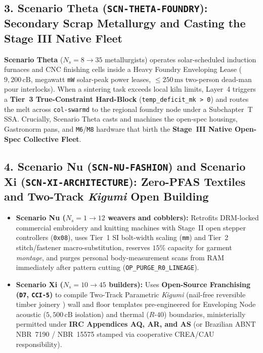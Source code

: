 \subsection{3. Scenario Theta (\texttt{SCN-THETA-FOUNDRY}): Secondary Scrap Metallurgy and Casting the Stage III Native Fleet}
\textbf{Scenario Theta} ($N_s = 8 \to 35$ metallurgists) operates solar-scheduled induction furnaces and CNC finishing cells inside a Heavy Foundry Enveloping Lease ($9{,}200\,\mathrm{cB}$, megawatt \texttt{mW} solar-peak power leases, $\le 250\,\mathrm{ms}$ two-person dead-man pour interlocks). When a sintering task exceeds local kiln limits, Layer~4 triggers a \textbf{Tier~3 True-Constraint Hard-Block} (\texttt{temp\_deficit\_mk > 0}) and routes the melt across \texttt{col-swarmd} to the regional foundry node under a Subchapter~T SSA. Crucially, Scenario Theta casts and machines the open-spec housings, Gastronorm pans, and \texttt{M6}/\texttt{M8} hardware that birth the \textbf{Stage~III Native Open-Spec Collective Fleet}.

\subsection{4. Scenario Nu (\texttt{SCN-NU-FASHION}) and Scenario Xi (\texttt{SCN-XI-ARCHITECTURE}): Zero-PFAS Textiles and Two-Track \textit{Kigumi} Open Building}
\begin{itemize}
    \item \textbf{Scenario Nu ($N_s = 1 \to 12$ weavers and cobblers):} Retrofits DRM-locked commercial embroidery and knitting machines with Stage~II open stepper controllers (\texttt{0x08}), uses Tier~1 SI bolt-width scaling (\texttt{mm}) and Tier~2 stitch/fastener macro-substitution, reserves $15\%$ capacity for garment \textit{montage}, and purges personal body-measurement scans from RAM immediately after pattern cutting (\texttt{OP\_PURGE\_R0\_LINEAGE}).
    \item \textbf{Scenario Xi ($N_s = 10 \to 45$ builders):} Uses \textbf{Open-Source Franchising (\texttt{D7}, \texttt{CCI-5})} to compile Two-Track Parametric \textit{Kigumi} (nail-free reversible timber joinery \parencite{habraken1972supports,brand1994buildings}) wall and floor templates pre-engineered for Enveloping Node acoustic ($5{,}500\,\mathrm{cB}$ isolation) and thermal ($R\text{-}40$) boundaries, ministerially permitted under \textbf{IRC Appendices AQ, AR, and AS} (or Brazilian ABNT NBR~7190 / NBR~15575 stamped via cooperative CREA/CAU responsibility).
\end{itemize}

